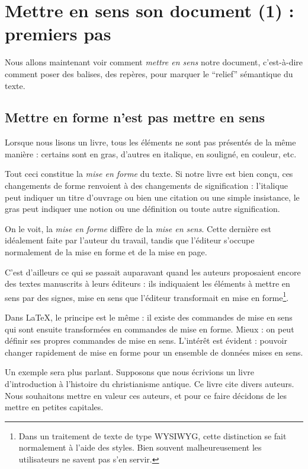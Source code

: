 \chapter{Mettre en sens son document (1) : premiers pas}

\begin{intro}
Nous allons maintenant voir comment \emph{mettre en sens} notre document, c'est-à-dire comment poser des balises, des repères, pour marquer le \enquote{relief} sémantique du texte.
\end{intro}

\section{Mettre en forme n'est pas mettre en sens}\label{sensforme}

Lorsque nous lisons un livre, tous les éléments ne sont pas présentés de la même manière : certains sont en gras, d'autres en italique, en souligné, en couleur, etc. 

Tout ceci constitue la \emph{mise en forme} du texte. Si notre livre est bien conçu, ces changements de forme renvoient à des changements de signification : l'italique peut indiquer un titre d'ouvrage ou bien une citation ou une simple insistance, le gras peut indiquer une notion ou une définition ou toute autre signification.

On le voit, la \emph{mise en forme} diffère de la \emph{mise en sens}. Cette dernière est idéalement faite par l'auteur du travail, tandis que l'éditeur s'occupe normalement de la mise en forme et de la mise en page.

C'est d'ailleurs ce qui se passait auparavant quand les auteurs proposaient encore des textes manuscrits à leurs éditeurs : ils indiquaient les éléments à mettre en sens par des signes, mise en sens que l'éditeur transformait en mise en forme\footnote{Dans un traitement de texte de type WYSIWYG, cette distinction se fait normalement à l'aide des styles. Bien souvent malheureusement les utilisateurs ne savent pas s'en servir.}.

Dans \LaTeX, le principe est le même : il existe des commandes de mise en sens qui sont ensuite transformées en commandes de mise en forme. Mieux : on peut définir ses propres commandes de mise en sens. L'intérêt est  évident : pouvoir changer rapidement de mise en forme pour un ensemble de données mises en sens.

Un exemple sera plus parlant. Supposons que nous écrivions un livre d'introduction à l'histoire du christianisme antique. Ce livre cite divers auteurs. Nous souhaitons mettre en valeur ces auteurs, et pour ce faire décidons de les mettre en petites capitales.

